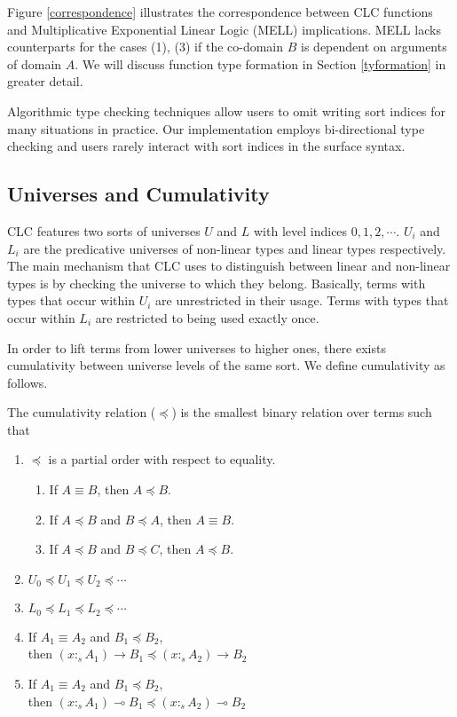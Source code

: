\documentclass[sigplan,screen,review,authordraft]{acmart}
\newcommand{\stype}[1]{:_#1}
\begin{document}
Figure \ref{correspondence} illustrates the correspondence between CLC functions and Multiplicative Exponential Linear Logic (MELL) implications. MELL lacks counterparts for the cases (1), (3) if the co-domain $B$ is dependent on arguments of domain $A$. We will discuss function type formation in Section \ref{tyformation} in greater detail.

Algorithmic type checking techniques allow users to omit writing sort indices for many situations in practice. Our implementation employs bi-directional type checking and users rarely interact with sort indices in the surface syntax.

\subsection{Universes and Cumulativity}
CLC features two sorts of universes $U$ and $L$ with level indices $0, 1, 2, \cdots$. $U_i$ and $L_i$ are the predicative universes of non-linear types and linear types respectively. The main mechanism that CLC uses to distinguish between linear and non-linear types is by checking the universe to which they belong. Basically, terms with types that occur within $U_i$ are unrestricted in their usage. Terms with types that occur within $L_i$ are restricted to being used exactly once.

In order to lift terms from lower universes to higher ones, there exists cumulativity between universe levels of the same sort. We define cumulativity as follows.

\begin{definition}
  The cumulativity relation ($\preceq$) is the smallest binary relation over terms such that
  \begin{enumerate}
    \item $\preceq$ is a partial order with respect to equality.
          \begin{enumerate}
            \item If $A \equiv B$, then $A \preceq B$.
            \item If $A \preceq B$ and $B \preceq A$, then $A \equiv B$.
            \item If $A \preceq B$ and $B \preceq C$, then $A \preceq B$.
          \end{enumerate}
    \item $U_0 \preceq U_1 \preceq U_2 \preceq \cdots$
    \item $L_0 \preceq L_1 \preceq L_2 \preceq \cdots$
    \item If $A_1 \equiv A_2$ and $B_1 \preceq B_2$, \\ then
          $(x \stype{s} A_1) \rightarrow B_1 \preceq (x \stype{s} A_2) \rightarrow B_2$
    \item If $A_1 \equiv A_2$ and $B_1 \preceq B_2$, \\ then
          $(x \stype{s} A_1) \multimap B_1 \preceq (x \stype{s} A_2) \multimap B_2$
  \end{enumerate}
\end{definition}
\end{document}
